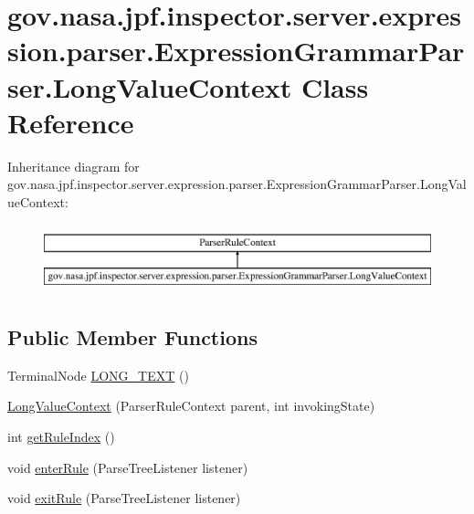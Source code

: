 \hypertarget{classgov_1_1nasa_1_1jpf_1_1inspector_1_1server_1_1expression_1_1parser_1_1_expression_grammar_parser_1_1_long_value_context}{}\section{gov.\+nasa.\+jpf.\+inspector.\+server.\+expression.\+parser.\+Expression\+Grammar\+Parser.\+Long\+Value\+Context Class Reference}
\label{classgov_1_1nasa_1_1jpf_1_1inspector_1_1server_1_1expression_1_1parser_1_1_expression_grammar_parser_1_1_long_value_context}
Inheritance diagram for gov.\+nasa.\+jpf.\+inspector.\+server.\+expression.\+parser.\+Expression\+Grammar\+Parser.\+Long\+Value\+Context\+:\begin{figure}[H]
\begin{center}
\leavevmode
\includegraphics[height=2.000000cm]{classgov_1_1nasa_1_1jpf_1_1inspector_1_1server_1_1expression_1_1parser_1_1_expression_grammar_parser_1_1_long_value_context}
\end{center}
\end{figure}
\subsection*{Public Member Functions}
\begin{DoxyCompactItemize}
\item 
Terminal\+Node \hyperlink{classgov_1_1nasa_1_1jpf_1_1inspector_1_1server_1_1expression_1_1parser_1_1_expression_grammar_parser_1_1_long_value_context_a9bab51cbd5827fe120619b0a19a74ffd}{L\+O\+N\+G\+\_\+\+T\+E\+XT} ()
\item 
\hyperlink{classgov_1_1nasa_1_1jpf_1_1inspector_1_1server_1_1expression_1_1parser_1_1_expression_grammar_parser_1_1_long_value_context_a3fe4a2cd717b5258b7ccbf2fdfeaaddf}{Long\+Value\+Context} (Parser\+Rule\+Context parent, int invoking\+State)
\item 
int \hyperlink{classgov_1_1nasa_1_1jpf_1_1inspector_1_1server_1_1expression_1_1parser_1_1_expression_grammar_parser_1_1_long_value_context_a3ebc82d3bf9e394b0b9f0f88995f926a}{get\+Rule\+Index} ()
\item 
void \hyperlink{classgov_1_1nasa_1_1jpf_1_1inspector_1_1server_1_1expression_1_1parser_1_1_expression_grammar_parser_1_1_long_value_context_ab4a7f3258326a960b8042b2022d3143d}{enter\+Rule} (Parse\+Tree\+Listener listener)
\item 
void \hyperlink{classgov_1_1nasa_1_1jpf_1_1inspector_1_1server_1_1expression_1_1parser_1_1_expression_grammar_parser_1_1_long_value_context_ae376855654ca9ba64839545051ca689c}{exit\+Rule} (Parse\+Tree\+Listener listener)
\end{DoxyCompactItemize}
